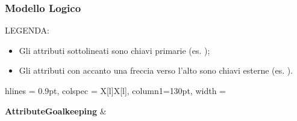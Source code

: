 \newpage

\subsubsection{Modello Logico}

LEGENDA:

\begin{itemize}
	\item Gli attributi sottolineati sono chiavi primarie
		(es. );
	\item Gli attributi con accanto una freccia
	verso l'alto sono chiavi esterne
		(es. ).
\end{itemize}

\bigskip

\begin{tblr}{
    hlines = {0.9pt},
    colspec = {X[l]X[l]}, column{1}={130pt},
    width = \textwidth
}

	{
		\textbf{AttributeGoalkeeping}
	}
	&
	{
		
}
\end{tblr}
